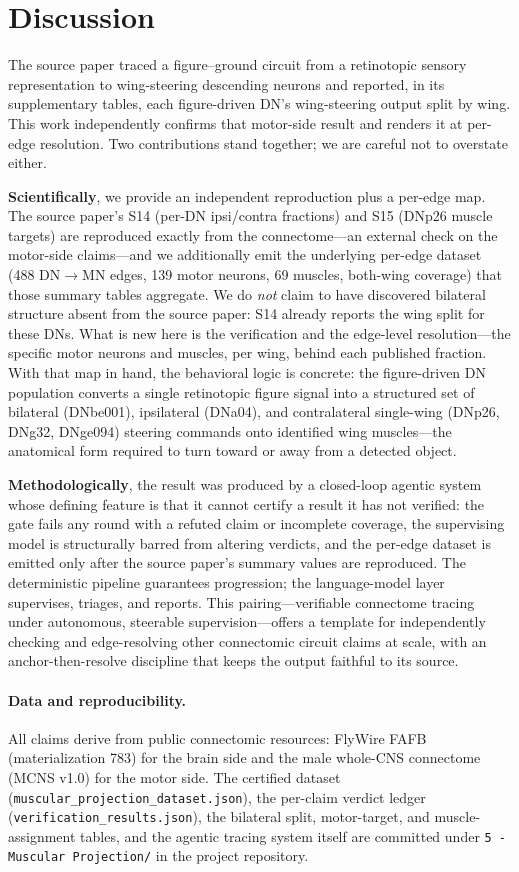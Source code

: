 \documentclass[11pt]{article}
\newcommand{\ttt}[1]{\texttt{\small #1}}
\begin{document}
\section{Discussion}

The source paper traced a figure--ground circuit from a retinotopic sensory representation to wing-steering
descending neurons and reported, in its supplementary tables, each figure-driven DN's wing-steering output
split by wing. This work independently confirms that motor-side result and renders it at per-edge
resolution. Two contributions stand together; we are careful not to overstate either.

\textbf{Scientifically}, we provide an independent reproduction plus a per-edge map. The source paper's
S14 (per-DN ipsi/contra fractions) and S15 (DNp26 muscle targets) are reproduced exactly from the
connectome---an external check on the motor-side claims---and we additionally emit the underlying
per-edge dataset (488 DN$\rightarrow$MN edges, 139 motor neurons, 69 muscles, both-wing coverage) that
those summary tables aggregate. We do \emph{not} claim to have discovered bilateral structure absent
from the source paper: S14 already reports the wing split for these DNs. What is new here is the
verification and the edge-level resolution---the specific motor neurons and muscles, per wing, behind
each published fraction. With that map in hand, the behavioral logic is concrete: the figure-driven DN
population converts a single retinotopic figure signal into a structured set of bilateral (DNbe001),
ipsilateral (DNa04), and contralateral single-wing (DNp26, DNg32, DNge094) steering commands onto
identified wing muscles---the anatomical form required to turn toward or away from a detected object.

\textbf{Methodologically}, the result was produced by a closed-loop agentic system whose defining
feature is that it cannot certify a result it has not verified: the gate fails any round with a refuted
claim or incomplete coverage, the supervising model is structurally barred from altering verdicts, and
the per-edge dataset is emitted only after the source paper's summary values are reproduced. The
deterministic pipeline guarantees progression; the language-model layer supervises, triages, and reports.
This pairing---verifiable connectome tracing under autonomous, steerable supervision---offers a template
for independently checking and edge-resolving other connectomic circuit claims at scale, with an
anchor-then-resolve discipline that keeps the output faithful to its source.

\paragraph{Data and reproducibility.} All claims derive from public connectomic resources: FlyWire FAFB
(materialization 783) for the brain side and the male whole-CNS connectome (MCNS v1.0) for the motor
side. The certified dataset (\ttt{muscular\_projection\_dataset.json}), the per-claim verdict ledger
(\ttt{verification\_results.json}), the bilateral split, motor-target, and muscle-assignment tables, and
the agentic tracing system itself are committed under \mbox{\ttt{5 - Muscular Projection/}} in the
project repository.
\end{document}

